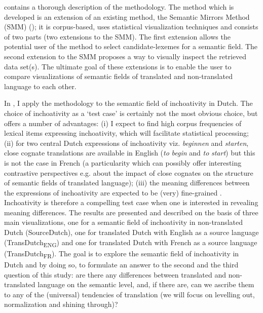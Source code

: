  contains a thorough description of the methodology. The method which is developed is an extension of an existing method, the Semantic Mirrors Method (SMM) (\citealt{johansson_translational_1998, aijmer_translations_2004, langemets_translations_2005}); it is corpus-based, uses statistical visualization techniques and consists of two parts (two extensions to the SMM). The first extension allows the potential user of the method to select candidate-lexemes for a semantic field. The second extension to the SMM proposes a way to visually inspect the retrieved data set(s). The ultimate goal of these extensions is to enable the user to compare visualizations of semantic fields of translated and non-translated language to each other.



In , I apply the methodology to the semantic field of inchoativity in Dutch. The choice of inchoativity as a ‘test case’ is certainly not the most obvious choice, but offers a number of advantages: (i) I expect to find high corpus frequencies of lexical items expressing inchoativity, which will facilitate statistical processing; (ii) for two central Dutch expressions of inchoativity viz. \textit{beginnen} and \textit{starten}, close cognate translations are available in English (\textit{to} \textit{begin} and \textit{to} \textit{start}) but this is not the case in French (a particularity which can possibly offer interesting contrastive perspectives e.g. about the impact of close cognates on the structure of semantic fields of translated language); (iii) the meaning differences between the expressions of inchoativity are expected to be (very) fine-grained \citep{zettersten_introspection_1996}. Inchoativity is therefore a compelling test case when one is interested in revealing meaning differences. The results are presented and described on the basis of three main visualizations, one for a semantic field of inchoativity in non-translated Dutch (SourceDutch), one for translated Dutch with English as a source language (TransDutch\textsubscript{ENG}) and one for translated Dutch with French as a source language (TransDutch\textsubscript{FR}). The goal is to explore the semantic field of inchoativity in Dutch and by doing so, to formulate an answer to the second and the third question of this study: are there any differences between translated and non-translated language on the semantic level, and, if there are, can we ascribe them to any of the (universal) tendencies of translation (we will focus on levelling out, normalization and shining through)?



